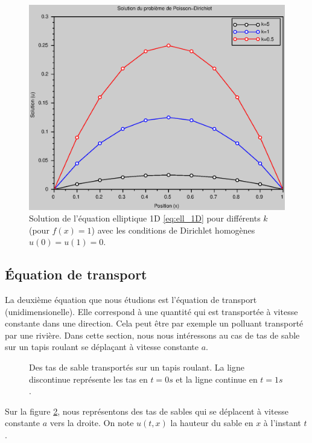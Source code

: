 \documentclass[12pt,a4paper,twoside]{article}
\begin{document}
\begin{figure}[h]
  \centering
  \includegraphics[width = 12cm]{Figures/Poisson_k.eps}
  \caption{Solution de l'\'equation elliptique 1D \eqref{eq:ell_1D}
  pour diff\'erents $k$ (pour $f(x)=1$) avec les conditions de Dirichlet homog\`enes
  $u(0) = u(1) = 0$.}
  \label{fig:ell_k}
\end{figure}


\subsection{\'Equation de transport}

La deuxi\`eme \'equation que nous \'etudions est l'\'equation de transport
(unidimensionelle).
Elle correspond \`a une quantit\'e qui est transport\'ee \`a vitesse
constante dans une direction.
Cela peut \^etre par exemple un polluant transport\'e par une rivi\`ere.
Dans cette section, nous nous int\'eressons au cas de tas de sable
sur un tapis roulant se d\'epla\c{c}ant \`a vitesse constante $a$.


\begin{figure}
\centering
\begin{tikzpicture}[scale = 0.5]
  
\end{tikzpicture}
\caption{Des tas de sable transport\'es sur un tapis roulant.
  La ligne discontinue repr\'esente les tas en $t=0s$ et la ligne
  continue en $t=1s$.}
\label{fig:transport}
\end{figure}

Sur la figure \ref{fig:transport}, nous repr\'esentons des tas de sables
qui se d\'eplacent \`a vitesse constante $a$ vers la droite.
On note $u(t,x)$ la hauteur du sable en $x$ \`a l'instant $t$.
\end{document}
